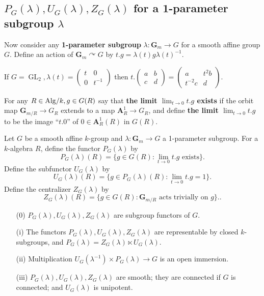 \documentclass[10pt]{article}
\renewcommand{\(}{\left(}
\renewcommand{\)}{\right)}
\newcommand{\actson}{\curvearrowright}
\numberwithin{thm}{subsection}
\begin{document}
\subsection{$P_G(\lambda),U_G(\lambda),Z_G(\lambda)$ for a 1-parameter subgroup $\lambda$}
Now consider any \textbf{1-parameter subgroup} $\lambda:\mathbf{G}_m\rightarrow G$ for a smooth affine group $G$.
Define an action of $\mathbf{G}_m\actson G$
by $t.g=\lambda(t)g\lambda(t)^{-1}$.
\begin{ex}\label{}
If $G=\operatorname{GL}_2, \lambda(t)=\left(\begin{smallmatrix}
 t&0\\0&t^{-1}
\end{smallmatrix}\right)$
then $t.\left(\begin{smallmatrix}
 a&b\\ c&d
\end{smallmatrix}\right)=\left(\begin{smallmatrix}
 a&t^2b\\ t^{-2}c&d
\end{smallmatrix}\right)$.
\end{ex}
For any $R\in {\rm{Alg}}/k,g\in G(R)$
say that \textbf{the limit $\lim_{t\rightarrow 0}t.g$ exists}
if the orbit map $\mathbf{G}_{m/R}\rightarrow G_R$
extends to a map $\mathbf{A}^1_R\rightarrow G_R$,
and define \textbf{the limit $\lim_{t\rightarrow 0}t.g$}
to be the image ``$t.0$'' of $0\in \mathbf{A}^1_R(R)$ in $G(R)$.
 
\begin{defn}\label{}
Let $G$ be a smooth affine $k$-group
and $\lambda:\mathbf{G}_m\rightarrow G$ a 1-parameter subgroup.
For a $k$-algebra $R$,
define the functor $P_G(\lambda)$ by  $$P_G(\lambda)(R)=\{g\in G(R):\lim_{t\rightarrow0} t.g\text{ exists}\}.$$
Define the subfunctor $U_G(\lambda)$ by
$$U_G(\lambda)(R)=\{g\in P_G(\lambda)(R):\lim_{t\rightarrow0}t.g=1\}.$$
Define the centralizer $Z_G(\lambda)$
by \[Z_G(\lambda)(R)=\{g\in G(R):\mathbf{G}_{m/R}\text{ acts trivially on }g\}..\]
\end{defn}

\begin{lem}\label{PGlambdaUGlambda}
\begin{itemize}
\item[(0)] $P_G(\lambda),U_G(\lambda),Z_G(\lambda)$ are subgroup functors
of $G$.
\item[(i)] The functors $P_G(\lambda),U_G(\lambda),Z_G(\lambda)$ are representable
by closed $k$-subgroups,
and $P_G(\lambda)=Z_G(\lambda)\ltimes U_G(\lambda)$.
\item[(ii)] Multiplication $U_G(\lambda^{-1})\times P_G(\lambda)\rightarrow G$ 
is an open immersion.
\item[(iii)]$P_G(\lambda),U_G(\lambda),Z_G(\lambda)$ are smooth;
they are connected if $G$ is connected;
and $U_G(\lambda)$ is unipotent.
\end{itemize}
\end{lem}
\end{document}
